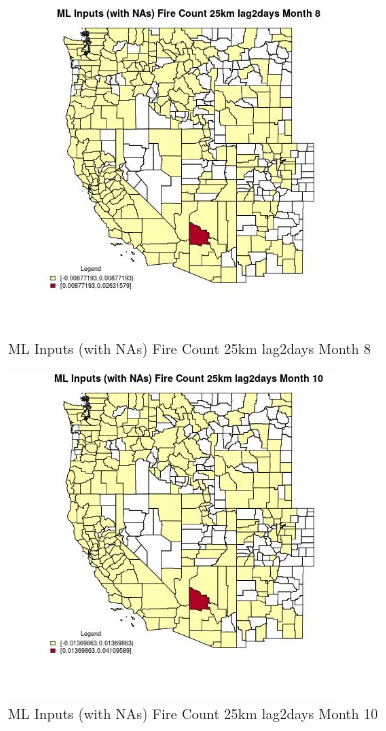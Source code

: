 \begin{figure} 
\centering  
\includegraphics[width=0.77\textwidth]{Code_Outputs/Report_ML_input_PM25_Step4_part_e_de_duplicated_aves_compiled_2019-05-20wNAs_CountyFire_Count_25km_lag2daysmedianMonth8.jpg} 
\caption{\label{fig:Report_ML_input_PM25_Step4_part_e_de_duplicated_aves_compiled_2019-05-20wNAsCountyFire_Count_25km_lag2daysmedianMonth8}ML Inputs (with NAs) Fire Count 25km lag2days Month 8} 
\end{figure} 
 

\begin{figure} 
\centering  
\includegraphics[width=0.77\textwidth]{Code_Outputs/Report_ML_input_PM25_Step4_part_e_de_duplicated_aves_compiled_2019-05-20wNAs_CountyFire_Count_25km_lag2daysmedianMonth10.jpg} 
\caption{\label{fig:Report_ML_input_PM25_Step4_part_e_de_duplicated_aves_compiled_2019-05-20wNAsCountyFire_Count_25km_lag2daysmedianMonth10}ML Inputs (with NAs) Fire Count 25km lag2days Month 10} 
\end{figure} 
 

